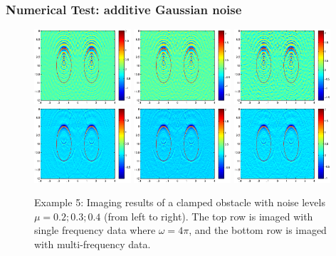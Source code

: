 \documentclass[utf-8,8pt]{beamer}
\newcommand{\om}{\omega}
\begin{document}
\begin{frame}
\frametitle{Numerical Test: additive Gaussian noise}
\begin{figure}[h]
	\centering
	\includegraphics[width=0.32\textwidth]{./graphic/bi_circle_4pi_error2.eps}
	\includegraphics[width=0.32\textwidth]{./graphic/bi_circle_4pi_error4.eps}
	\includegraphics[width=0.32\textwidth]{./graphic/bi_circle_4pi_error6.eps}\\
	\includegraphics[width=0.32\textwidth]{./graphic/bi_circle_multi_2_8_error2.eps}
	\includegraphics[width=0.32\textwidth]{./graphic/bi_circle_multi_2_8_error4.eps}
	\includegraphics[width=0.32\textwidth]{./graphic/bi_circle_multi_2_8_error6.eps}
	
	\caption{Example 5: Imaging results of a clamped obstacle with noise levels $\mu =  0.2; 0.3; 0.4$ (from left to
		right). The top row is imaged with single frequency data where $\om=4\pi$, and the
		bottom row is imaged with multi-frequency data.}
\end{figure}
\end{frame}
\end{document}
